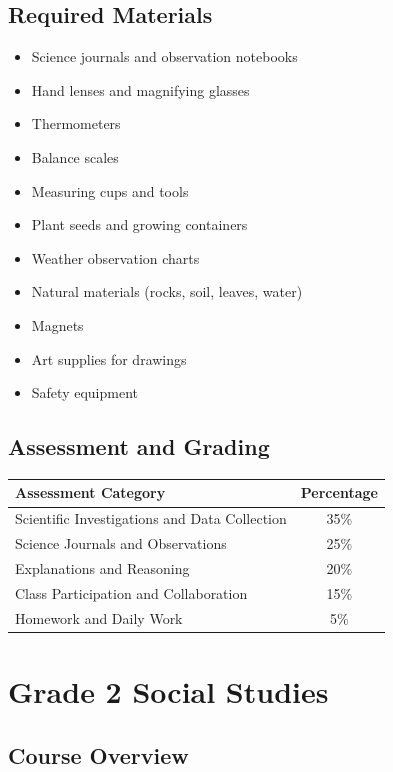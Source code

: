 \documentclass[11pt,letterpaper]{report}
\begin{document}
\section{Required Materials}

\begin{itemize}
    \item Science journals and observation notebooks
    \item Hand lenses and magnifying glasses
    \item Thermometers
    \item Balance scales
    \item Measuring cups and tools
    \item Plant seeds and growing containers
    \item Weather observation charts
    \item Natural materials (rocks, soil, leaves, water)
    \item Magnets
    \item Art supplies for drawings
    \item Safety equipment
\end{itemize}

\section{Assessment and Grading}

\begin{center}
\begin{tabular}{|l|c|}
\hline
\textbf{Assessment Category} & \textbf{Percentage} \\
\hline
Scientific Investigations and Data Collection & 35\% \\
\hline
Science Journals and Observations & 25\% \\
\hline
Explanations and Reasoning & 20\% \\
\hline
Class Participation and Collaboration & 15\% \\
\hline
Homework and Daily Work & 5\% \\
\hline
\end{tabular}
\end{center}

\chapter{Grade 2 Social Studies}

\section{Course Overview}
\end{document}
